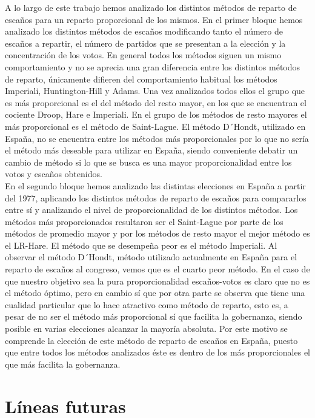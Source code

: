 \documentclass[12pt,a4paper,]{book}
\numberwithin{dummy}{section}
\theoremstyle{ocrenumbox}
\theoremstyle{blacknumex}
\theoremstyle{blacknumbox}
\theoremstyle{ocrenum}
\theoremstyle{ocrenum}
\begin{document}
A lo largo de este trabajo hemos analizado los distintos métodos de
reparto de escaños para un reparto proporcional de los mismos. En el
primer bloque hemos analizado los distintos métodos de escaños
modificando tanto el número de escaños a repartir, el número de partidos
que se presentan a la elección y la concentración de los votos. En
general todos los métodos siguen un mismo comportamiento y no se aprecia
una gran diferencia entre los distintos métodos de reparto, únicamente
difieren del comportamiento habitual los métodos Imperiali,
Huntington-Hill y Adams. Una vez analizados todos ellos el grupo que es
más proporcional es el del método del resto mayor, en los que se
encuentran el cociente Droop, Hare e Imperiali. En el grupo de los
métodos de resto mayores el más proporcional es el método de
Saint-Lague. El método D´Hondt, utilizado en España, no se encuentra
entre los métodos más proporcionales por lo que no sería el método más
deseable para utilizar en España, siendo conveniente debatir un cambio
de método si lo que se busca es una mayor proporcionalidad entre los
votos y escaños obtenidos.\\
En el segundo bloque hemos analizado las distintas elecciones en España
a partir del 1977, aplicando los distintos métodos de reparto de escaños
para compararlos entre sí y analizando el nivel de proporcionalidad de
los distintos métodos. Los métodos más proporcionados resultaron ser el
Saint-Lague por parte de los métodos de promedio mayor y por los métodos
de resto mayor el mejor método es el LR-Hare. El método que se desempeña
peor es el método Imperiali. Al observar el método D´Hondt, método
utilizado actualmente en España para el reparto de escaños al congreso,
vemos que es el cuarto peor método. En el caso de que nuestro objetivo
sea la pura proporcionalidad escaños-votos es claro que no es el método
óptimo, pero en cambio sí que por otra parte se observa que tiene una
cualidad particular que lo hace atractivo como método de reparto, esto
es, a pesar de no ser el método más proporcional sí que facilita la
gobernanza, siendo posible en varias elecciones alcanzar la mayoría
absoluta. Por este motivo se comprende la elección de este método de
reparto de escaños en España, puesto que entre todos los métodos
analizados éste es dentro de los más proporcionales el que más facilita
la gobernanza.

\hypertarget{luxedneas-futuras}{%
\section{Líneas futuras}\label{luxedneas-futuras}}
\end{document}
